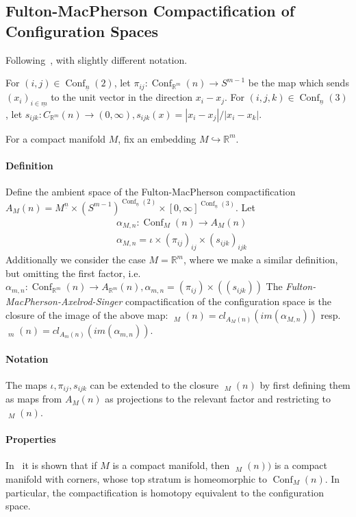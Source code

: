 \documentclass{scrartcl}
\theoremstyle{plain}
\theoremstyle{definition}
\newcommand{\R}{\mathbb R}
\newcommand{\abs}[1]{\left\lvert#1\right\rvert}
\DeclareMathOperator{\Conf}{Conf}
\DeclareMathOperator{\cConf}{\overline{Conf}}
\begin{document}
\subsection{Fulton-MacPherson Compactification of Configuration Spaces}

Following~\cite{sinha2004manifold}, with slightly different notation.

For $(i,j)\in \Conf_{\underline n}(2)$, let $\pi_{ij}\colon \Conf_{\R^m}(n)\to S^{m-1}$ be the map which sends $(x_i)_{i\in\underline m}$ to the unit vector in the direction $x_i-x_j$. For $(i,j,k)\in\Conf_{\underline n}(3)$, let $s_{ijk}\colon C_{\R^m}(n) \to (0, \infty), s_{ijk}(x) = \abs{x_i-x_j} / \abs{x_i-x_k}$.

For a compact manifold $M$, fix an embedding $M \hookrightarrow \R^m$.

\paragraph{Definition} Define the ambient space of the Fulton-MacPherson compactification $A_M(n) = M^{\underline n} \times (S^{m-1})^{\Conf_{\underline n}(2)} \times [0, \infty]^{\Conf_{\underline n}(3)}$. Let 
\begin{align*}
    &\alpha_{M,n} \colon \Conf_M(n) \to A_M(n)\\
    &\alpha_{M,n} = \iota \times \left(\pi_{ij}\right)_{ij} \times \left(s_{ijk}\right)_{ijk}
\end{align*}
Additionally we consider the case $M=\R^m$, where we make a similar definition, but omitting the first factor, i.e. $\alpha_{m,n} \colon \Conf_{\R^m}(n) \to A_{\R^m}(n), \alpha_{m,n} = \left(\pi_{ij}\right) \times \left((s_{ijk})\right)$
The \emph{Fulton-MacPherson-Axelrod-Singer} compactification of the configuration space is the closure of the image of the above map: $\cConf_M(n) = cl_{A_M(n)}(im(\alpha_{M,n}))$ resp.\ $\cConf_m(n) = cl_{A_m(n)}(im(\alpha_{m,n}))$. 

\paragraph{Notation} The maps $\iota, \pi_{ij}, s_{ijk}$ can be extended to the closure $\cConf_M(n)$ by first defining them as maps from $A_M(n)$ as projections to the relevant factor and restricting to $\cConf_M(n)$. 



\paragraph{Properties} In~\cite{sinha2004manifold} it is shown that if $M$ is a compact manifold, then $\cConf_M(n))$ is a compact manifold with corners, whose top stratum is homeomorphic to $\Conf_M(n)$. In particular, the compactification is homotopy equivalent to the configuration space. 
\end{document}
